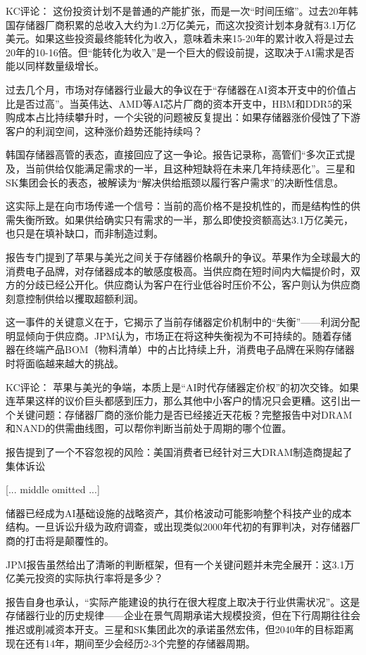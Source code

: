 \documentclass[11pt]{ctexart}
\begin{document}
KC评论： 这份投资计划不是普通的产能扩张，而是一次“时间压缩”。过去20年韩国存储器厂商积累的总收入大约为1.2万亿美元，而这次投资计划本身就有3.1万亿美元。如果这些投资最终能转化为收入，意味着未来15-20年的累计收入将是过去20年的10-16倍。但“能转化为收入”是一个巨大的假设前提，这取决于AI需求是否能以同样数量级增长。

过去几个月，市场对存储器行业最大的争议在于“存储器在AI资本开支中的价值占比是否过高”。当英伟达、AMD等AI芯片厂商的资本开支中，HBM和DDR5的采购成本占比持续攀升时，一个尖锐的问题被反复提出：如果存储器涨价侵蚀了下游客户的利润空间，这种涨价趋势还能持续吗？

韩国存储器高管的表态，直接回应了这一争论。报告记录称，高管们“多次正式提及，当前供给仅能满足需求的一半，且这种短缺将在未来几年持续恶化”。三星和SK集团会长的表态，被解读为“解决供给瓶颈以履行客户需求”的决断性信息。

这实际上是在向市场传递一个信号：当前的高价格不是投机性的，而是结构性的供需失衡所致。如果供给确实只有需求的一半，那么即使投资额高达3.1万亿美元，也只是在填补缺口，而非制造过剩。

报告专门提到了苹果与美光之间关于存储器价格飙升的争议。苹果作为全球最大的消费电子品牌，对存储器成本的敏感度极高。当供应商在短时间内大幅提价时，双方的分歧已经公开化。供应商认为客户在行业低谷时压价不公，客户则认为供应商刻意控制供给以攫取超额利润。

这一事件的关键意义在于，它揭示了当前存储器定价机制中的“失衡”——利润分配明显倾向于供应商。JPM认为，市场正在将这种失衡视为不可持续的。随着存储器在终端产品BOM（物料清单）中的占比持续上升，消费电子品牌在采购存储器时将面临越来越大的挑战。

KC评论： 苹果与美光的争端，本质上是“AI时代存储器定价权”的初次交锋。如果连苹果这样的议价巨头都感到压力，那么其他中小客户的情况只会更糟。这引出一个关键问题：存储器厂商的涨价能力是否已经接近天花板？完整报告中对DRAM和NAND的供需曲线图，可以帮你判断当前处于周期的哪个位置。

报告提到了一个不容忽视的风险：美国消费者已经针对三大DRAM制造商提起了集体诉讼

[... middle omitted ...]

储器已经成为AI基础设施的战略资产，其价格波动可能影响整个科技产业的成本结构。一旦诉讼升级为政府调查，或出现类似2000年代初的有罪判决，对存储器厂商的打击将是颠覆性的。

JPM报告虽然给出了清晰的判断框架，但有一个关键问题并未完全展开：这3.1万亿美元投资的实际执行率将是多少？

报告自身也承认，“实际产能建设的执行在很大程度上取决于行业供需状况”。这是存储器行业的历史规律——企业在景气周期承诺大规模投资，但在下行周期往往会推迟或削减资本开支。三星和SK集团此次的承诺虽然宏伟，但2040年的目标距离现在还有14年，期间至少会经历2-3个完整的存储器周期。
\end{document}
